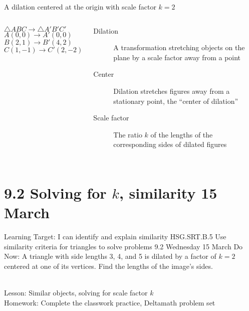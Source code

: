 \begin{frame}{A dilation centered at the origin with scale factor $k=2$}
  \begin{columns}
    $\triangle ABC \rightarrow \triangle A'B'C'$\\[0.2cm]
    $A(0,0) \rightarrow A'(0,0)$\\
    $B(2,1) \rightarrow B'(4,2)$\\
    $C(1,-1) \rightarrow C'(2,-2)$ \vspace{0.3cm}
      \begin{description}
        \item[Dilation] A transformation stretching objects on the plane by a scale factor away from a point
        \item[Center] Dilation stretches figures away from a stationary point, the ``center of dilation''
        \item[Scale factor] The ratio $k$ of the lengths of the corresponding sides of dilated figures
      \end{description}
    \begin{flushright}
    \end{flushright}
  \end{columns}
\end{frame}

\section{9.2 Solving for $k$, similarity \hfill 15 March \,}
\begin{frame}{Learning Target: I can identify and explain similarity}
  {HSG.SRT.B.5 Use similarity criteria for triangles to solve problems \hfill \alert{9.2 Wednesday 15 March}}
    Do Now: A triangle with side lengths 3, 4, and 5 is dilated by a factor of $k=2$ centered at one of its vertices. Find the lengths of the image's sides. \\[0.5cm]
     \\[0.5cm]
    Lesson: Similar objects, solving for scale factor $k$ \\[0.5cm]
    Homework: Complete the classwork practice, Deltamath problem set \\[0.5cm]
\end{frame}


